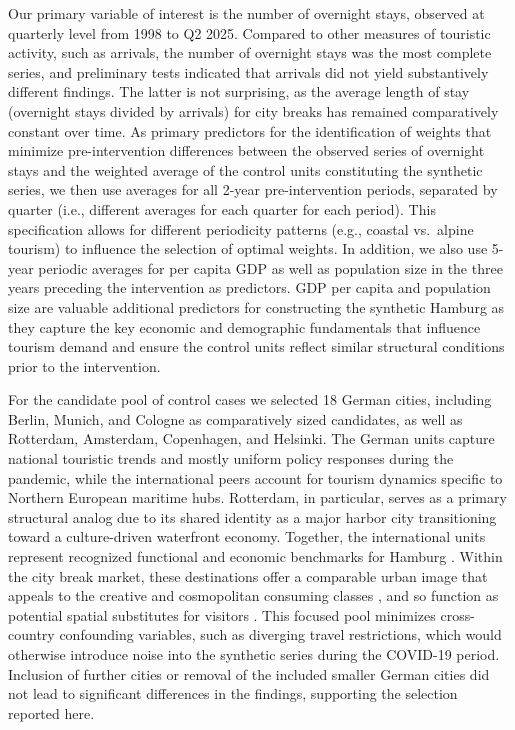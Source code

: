 \documentclass[a4paper, 12pt]{article}
\begin{document}
Our primary variable of interest is the number of overnight stays, observed at quarterly level from 1998 to Q2 2025. Compared to other measures of touristic activity, such as arrivals, the number of overnight stays was the most complete series, and preliminary tests indicated that arrivals did not yield substantively different findings. The latter is not surprising, as the average length of stay (overnight stays divided by arrivals) for city breaks has remained comparatively constant over time. As primary predictors for the identification of weights that minimize pre-intervention differences between the observed series of overnight stays and the weighted average of the control units constituting the synthetic series, we then use averages for all 2-year pre-intervention periods, separated by quarter (i.e., different averages for each quarter for each period). This specification allows for different periodicity patterns (e.g., coastal vs.\ alpine tourism) to influence the selection of optimal weights. In addition, we also use 5-year periodic averages for per capita GDP as well as population size in the three years preceding the intervention as predictors. GDP per capita and population size are valuable additional predictors for constructing the synthetic Hamburg as they capture the key economic and demographic fundamentals that influence tourism demand and ensure the control units reflect similar structural conditions prior to the intervention.

For the candidate pool of control cases we selected 18 German cities, including Berlin, Munich, and Cologne as comparatively sized candidates, as well as Rotterdam, Amsterdam, Copenhagen, and Helsinki. The German units capture national touristic trends and mostly uniform policy responses during the pandemic, while the international peers account for tourism dynamics specific to Northern European maritime hubs. Rotterdam, in particular, serves as a primary structural analog due to its shared identity as a major harbor city transitioning toward a culture-driven waterfront economy. Together, the international units represent recognized functional and economic benchmarks for Hamburg \citep{europeancommission.jointresearchcentre.2023a}. Within the city break market, these destinations offer a comparable urban image that appeals to the creative and cosmopolitan consuming classes \citep{maitland2010}, and so function as potential spatial substitutes for visitors \citep{cakar2025}. This focused pool minimizes cross-country confounding variables, such as diverging travel restrictions, which would otherwise introduce noise into the synthetic series during the COVID-19 period. Inclusion of further cities or removal of the included smaller German cities did not lead to significant differences in the findings, supporting the selection reported here.
\end{document}
